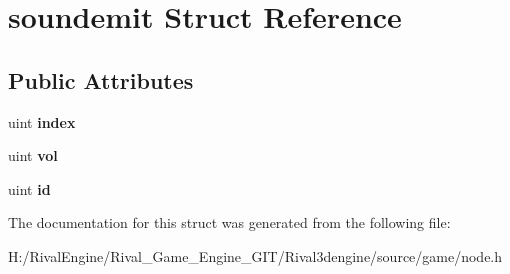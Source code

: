 \hypertarget{structsoundemit}{}\section{soundemit Struct Reference}
\label{structsoundemit}
\subsection*{Public Attributes}
\begin{DoxyCompactItemize}
\item 
\mbox{\label{structsoundemit_ac445e18c4cde16f0c6028d3567476425}} 
uint {\bfseries index}
\item 
\mbox{\label{structsoundemit_aedd61f819a80afb4b4828975ca6416cc}} 
uint {\bfseries vol}
\item 
\mbox{\label{structsoundemit_a0ead4f7cbb4d5a570cfb559def8ebfe4}} 
uint {\bfseries id}
\end{DoxyCompactItemize}


The documentation for this struct was generated from the following file\+:\begin{DoxyCompactItemize}
\item 
H\+:/\+Rival\+Engine/\+Rival\+\_\+\+Game\+\_\+\+Engine\+\_\+\+G\+I\+T/\+Rival3dengine/source/game/node.\+h\end{DoxyCompactItemize}
